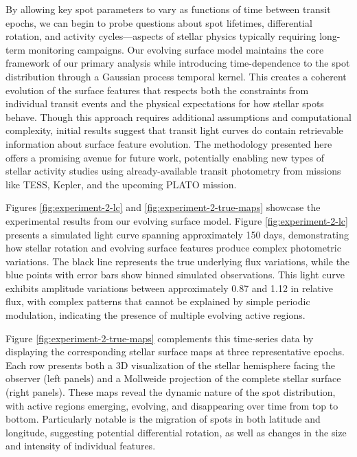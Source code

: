 \documentclass[twocolumn]{aastex631}
\begin{document}
By allowing key spot parameters to vary as functions of time between transit epochs, we can begin to probe questions about spot 
lifetimes, differential rotation, and activity cycles—aspects of stellar physics typically requiring long-term monitoring campaigns. 
Our evolving surface model maintains the core framework of our primary analysis while introducing time-dependence to the 
spot distribution through a Gaussian process temporal kernel. This creates a coherent evolution of the surface features that 
respects both the constraints from individual transit events and the physical expectations for how stellar spots behave.
Though this approach requires additional assumptions and computational complexity, initial results suggest that transit light 
curves do contain retrievable information about surface feature evolution. The methodology presented here offers a 
promising avenue for future work, potentially enabling new types of stellar activity studies using already-available 
transit photometry from missions like TESS, Kepler, and the upcoming PLATO mission.

Figures \ref{fig:experiment-2-lc} and \ref{fig:experiment-2-true-maps} showcase the experimental results from our 
evolving surface model. Figure \ref{fig:experiment-2-lc} presents a simulated light curve spanning approximately 150 days, 
demonstrating how stellar rotation and evolving surface features produce complex photometric variations. The black line 
represents the true underlying flux variations, while the blue points with error bars show binned simulated observations. 
This light curve exhibits amplitude variations between approximately 0.87 and 1.12 in relative flux, with complex patterns 
that cannot be explained by simple periodic modulation, indicating the presence of multiple evolving active regions.

Figure \ref{fig:experiment-2-true-maps} complements this time-series data by displaying the corresponding stellar 
surface maps at three representative epochs. Each row presents both a 3D visualization of the stellar hemisphere facing the 
observer (left panels) and a Mollweide projection of the complete stellar surface (right panels). 
These maps reveal the dynamic nature of the spot distribution, with active regions emerging, evolving, and disappearing over time
from top to bottom. Particularly notable is the migration of spots in both latitude and longitude, suggesting potential 
differential rotation, as well as changes in the size and intensity of individual features.
\end{document}
